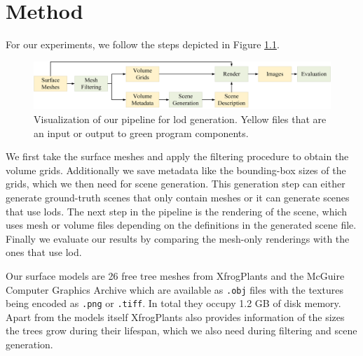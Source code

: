 \chapter{Method}
\label{chap:method}
For our experiments, we follow the steps depicted in Figure \ref{fig:pipeline}.
\begin{figure}[ht]
    \centering
    \includegraphics[width=1.0\linewidth]{img/pipeline.png}
    \caption[Visualization of the pipeline the thesis built upon]{Visualization of our pipeline for \ac{lod} generation. Yellow files that are an input or output to green program components.}
    \label{fig:pipeline}
\end{figure}
We first take the surface meshes and apply the filtering procedure to obtain the volume grids.
Additionally we save metadata like the bounding-box sizes of the grids, which we then need for scene generation.
This generation step can either generate ground-truth scenes that only contain meshes or it can generate scenes that use \acp{lod}.
The next step in the pipeline is the rendering of the scene, which uses mesh or volume files depending on the definitions in the generated scene file.
Finally we evaluate our results by comparing the mesh-only renderings with the ones that use \ac{lod}.

Our surface models are 26 free tree meshes from XfrogPlants \cite{xfrogplants} and the McGuire Computer Graphics Archive \cite{McGuire2017Data} which are available as \texttt{.obj} files with the textures being encoded as \texttt{.png} or \texttt{.tiff}.
In total they occupy 1.2 GB of disk memory.
Apart from the models itself XfrogPlants also provides information of the sizes the trees grow during their lifespan, which we also need during filtering and scene generation.

